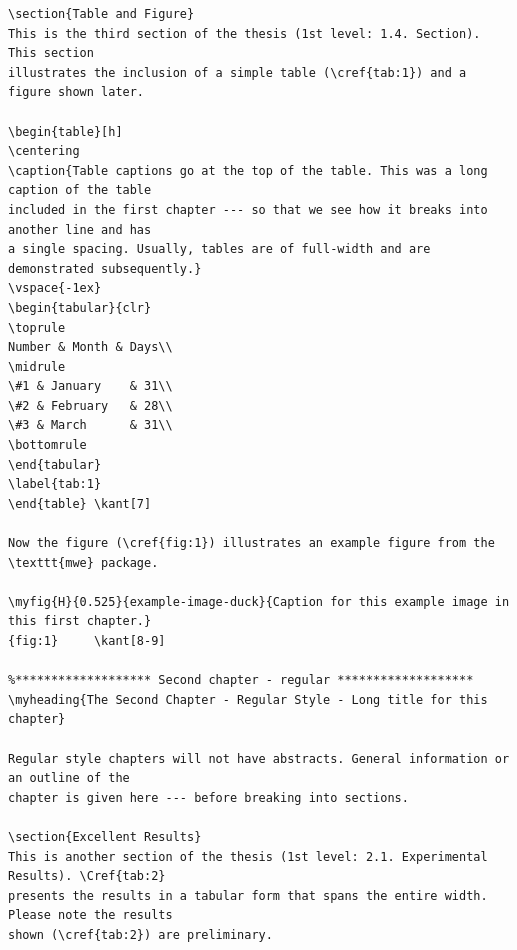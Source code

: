 \documentclass[letterpaper]{refart}
\begin{document}
{\begin{verbatim}
\section{Table and Figure}
This is the third section of the thesis (1st level: 1.4. Section). This section
illustrates the inclusion of a simple table (\cref{tab:1}) and a figure shown later.

\begin{table}[h]
\centering
\caption{Table captions go at the top of the table. This was a long caption of the table
included in the first chapter --- so that we see how it breaks into another line and has
a single spacing. Usually, tables are of full-width and are demonstrated subsequently.}
\vspace{-1ex}
\begin{tabular}{clr}
\toprule
Number & Month & Days\\
\midrule
\#1 & January    & 31\\
\#2 & February   & 28\\
\#3 & March      & 31\\
\bottomrule
\end{tabular}
\label{tab:1}
\end{table}	\kant[7]

Now the figure (\cref{fig:1}) illustrates an example figure from the \texttt{mwe} package.

\myfig{H}{0.525}{example-image-duck}{Caption for this example image in this first chapter.}
{fig:1} 	\kant[8-9]

%******************* Second chapter - regular *******************
\myheading{The Second Chapter - Regular Style - Long title for this chapter}

Regular style chapters will not have abstracts. General information or an outline of the 
chapter is given here --- before breaking into sections.

\section{Excellent Results}
This is another section of the thesis (1st level: 2.1. Experimental Results). \Cref{tab:2} 
presents the results in a tabular form that spans the entire width. Please note the results 
shown (\cref{tab:2}) are preliminary.


\end{verbatim}}
\end{document}
